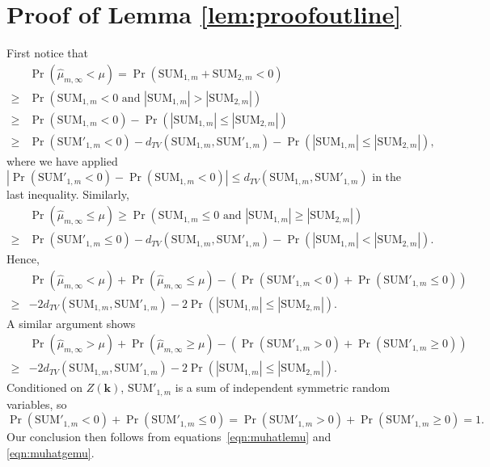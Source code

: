 \documentclass{article}
\theoremstyle{definition}
\renewcommand{\le}{\leqslant}
\renewcommand{\ge}{\geqslant}
\renewcommand{\leq}{\leqslant}
\renewcommand{\geq}{\geqslant}
\newcommand{\bsk}{\boldsymbol{k}}
\begin{document}
\section{Proof of Lemma \ref{lem:proofoutline}}
    First notice that
\begin{align*}
    &\Pr(\hat{\mu}_{m,\infty}<\mu) =  \Pr(\mathrm{SUM}_{1,m}+\mathrm{SUM}_{2,m}<0) \nonumber\\
    \geq & \Pr(\mathrm{SUM}_{1,m}<0 \text{ and } |\mathrm{SUM}_{1,m}|> |\mathrm{SUM}_{2,m}| ) \nonumber\\
    \geq & \Pr(\mathrm{SUM}_{1,m}<0) - \Pr(|\mathrm{SUM}_{1,m}|\leq |\mathrm{SUM}_{2,m}| )\nonumber\\
    \geq & \Pr(\mathrm{SUM}'_{1,m}<0) -d_{TV}(\mathrm{SUM}_{1,m},\mathrm{SUM}'_{1,m})- \Pr(|\mathrm{SUM}_{1,m}|\leq |\mathrm{SUM}_{2,m}| ),
\end{align*}
where we have applied $|\Pr(\mathrm{SUM}'_{1,m}<0)-\Pr(\mathrm{SUM}_{1,m}<0)|\leq d_{TV}(\mathrm{SUM}_{1,m},\mathrm{SUM}'_{1,m})$ in the last inequality.
Similarly, 
\begin{align*}
   &\Pr(\hat{\mu}_{m,\infty}\leq \mu) \geq  \Pr(\mathrm{SUM}_{1,m}\leq 0 \text{ and } |\mathrm{SUM}_{1,m}|\geq |\mathrm{SUM}_{2,m}| ) \\
   \geq & \Pr(\mathrm{SUM}'_{1,m}\leq 0) -d_{TV}(\mathrm{SUM}_{1,m},\mathrm{SUM}'_{1,m})- \Pr(|\mathrm{SUM}_{1,m}|< |\mathrm{SUM}_{2,m}| ).
\end{align*}
Hence,
\begin{align}\label{eqn:muhatlemu}
        &\Pr(\hat{\mu}_{m,\infty}<\mu)+\Pr(\hat{\mu}_{m,\infty}\le\mu)-\left(\Pr(\mathrm{SUM}'_{1,m}<0)+\Pr(\mathrm{SUM}'_{1,m}\leq 0)\right)\\
        \geq &-2d_{TV}(\mathrm{SUM}_{1,m},\mathrm{SUM}'_{1,m})- 2\Pr(|\mathrm{SUM}_{1,m}|\leq |\mathrm{SUM}_{2,m}| ).\nonumber
    \end{align}
  A similar argument shows
\begin{align}\label{eqn:muhatgemu}
        &\Pr(\hat{\mu}_{m,\infty}>\mu)+\Pr(\hat{\mu}_{m,\infty}\ge\mu)-\left(\Pr(\mathrm{SUM}'_{1,m}>0)+\Pr(\mathrm{SUM}'_{1,m}\geq 0)\right)\\
        \geq &-2d_{TV}(\mathrm{SUM}_{1,m},\mathrm{SUM}'_{1,m})- 2\Pr(|\mathrm{SUM}_{1,m}|\leq |\mathrm{SUM}_{2,m}| ). \nonumber
    \end{align}  
    Conditioned on $Z(\bsk)$, $\mathrm{SUM}'_{1,m}$ is a sum of independent symmetric random variables, so
    $$\Pr(\mathrm{SUM}'_{1,m}< 0)+\Pr(\mathrm{SUM}'_{1,m}\le 0)=\Pr(\mathrm{SUM}'_{1,m}>0)+\Pr(\mathrm{SUM}'_{1,m}\geq 0)=1.$$
    Our conclusion then follows from equations~\eqref{eqn:muhatlemu} and \eqref{eqn:muhatgemu}.
\end{document}
